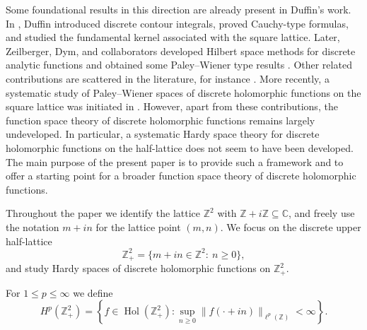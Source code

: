 \documentclass[12pt,a4paper,reqno]{amsart}
\theoremstyle{definition}
\theoremstyle{definition}\newtheorem{defn}[thm]{Definition}
\begin{document}
    Some foundational results in this direction are already present in Duffin's
    work. In \cite{D}, Duffin introduced discrete contour integrals, proved
    Cauchy-type formulas, and studied the fundamental kernel associated with the
    square lattice. Later, Zeilberger, Dym, and collaborators developed Hilbert
    space methods for discrete analytic functions and obtained some Paley--Wiener
    type results \cite{ZD,Zei77a,Zei77b,Zei77c}. Other related contributions are
    scattered in the literature, for instance \cite{Bol68,DM71,Mug80}. More
    recently, a systematic study of Paley--Wiener spaces of discrete holomorphic
    functions on the square lattice was initiated in \cite{MM}. However, apart from
    these contributions, the function space theory of discrete holomorphic
    functions remains largely undeveloped. In particular, a systematic Hardy space
    theory for discrete holomorphic functions on the half-lattice does not seem to
    have been developed.
    The main purpose of the present paper is to provide such a framework and to offer a starting point for a broader function space theory of discrete holomorphic functions.
    
    Throughout the paper we identify the lattice $\mathbb Z^2$ with $\mathbb Z+i\mathbb Z\subseteq\mathbb C$, and freely use the notation $m+in$ for the lattice point $(m,n)$. We focus on the discrete upper half-lattice
    \[
    \mathbb Z^2_+
    =
    \{m+in\in\mathbb Z^2:\ n\geqslant0\},
    \]
    and study Hardy spaces of discrete holomorphic functions on $\mathbb Z^2_+$.
    
    
    For $1\leqslant p\leqslant\infty$ we define
    \[
    H^p(\mathbb{Z}^2_+)
    =
    \left\{
    f\in \operatorname{Hol}(\mathbb Z^2_+):
    \sup_{n\geqslant0}\|f(\cdot+in)\|_{\ell^p(\mathbb Z)}<\infty
    \right\}.
    \]
    
\end{document}
